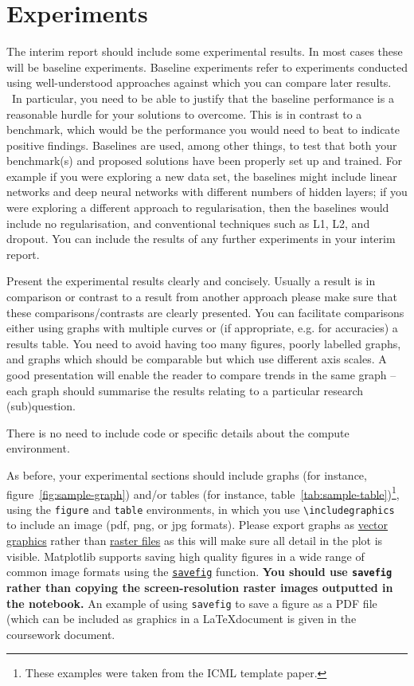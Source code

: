 \documentclass{article}
\begin{document}
\section{Experiments}
\label{sec:expts}
The interim report should include some experimental results.  In most cases these will be baseline experiments. Baseline experiments refer to experiments conducted using well-understood approaches against which you can compare later results.  In particular, you need to be able to justify that the baseline performance is a reasonable hurdle for your solutions to overcome. This is in contrast to a benchmark, which would be the performance you would need to beat to indicate positive findings. Baselines are used, among other things, to test that both your benchmark(s) and proposed solutions have been properly set up and trained. For example if you were exploring a new data set, the baselines might include linear networks and deep neural networks with different numbers of hidden layers;  if you were exploring a different approach to regularisation, then the baselines would include no regularisation, and conventional techniques such as L1, L2, and dropout.  You can include the results of any further experiments in your interim report.



Present the experimental results clearly and concisely.  Usually a result is in comparison or contrast to a result from another approach please make sure that these comparisons/contrasts are clearly presented.  You can facilitate comparisons either using graphs with multiple curves or (if appropriate, e.g. for accuracies) a results table. You need to avoid having too many figures, poorly labelled graphs, and graphs which should be comparable but which use different axis scales. A good presentation will enable the reader to compare trends in the same graph -- each graph should summarise the results relating to a particular research (sub)question.

There is no need to include code or specific details about the compute environment.

As before, your experimental sections should include graphs (for instance, figure~\ref{fig:sample-graph}) and/or tables (for instance, table~\ref{tab:sample-table})\footnote{These examples were taken from the ICML template paper.}, using the \verb+figure+ and \verb+table+ environments, in which you use \verb+\includegraphics+ to include an image (pdf, png, or jpg formats).  Please export graphs as 
\href{https://en.wikipedia.org/wiki/Vector_graphics}{vector graphics}
rather than \href{https://en.wikipedia.org/wiki/Raster_graphics}{raster
files} as this will make sure all detail in the plot is visible.
Matplotlib supports saving high quality figures in a wide range of
common image formats using the
\href{http://matplotlib.org/api/pyplot_api.html\#matplotlib.pyplot.savefig}{\texttt{savefig}}
function. \textbf{You should use \texttt{savefig} rather than copying
the screen-resolution raster images outputted in the notebook.} An
example of using \texttt{savefig} to save a figure as a PDF file (which
can be included as graphics in a \LaTeX document is given in the coursework document.
\end{document}
